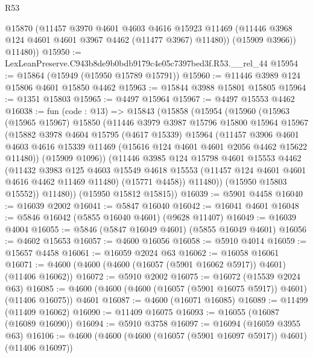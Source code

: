 \begin{lexlean}{R53}
\begin{coremodule}
          @15870
          (@11457
            @3970
            @4601
            @4603
            @4616
            @15923
            @11469
            (@11446 @3968 @124 @4601 @4601 @3967 @4462 (@11477 @3967) @11480))
          (@15909 @3966))
        @11480))
@15950 := LexLeanPreserve.C943b8de9b0bdb9179c4e05c7397bed3f.R53.__rel_44
@15954 := @15864 (@15949 (@15950 @15789 @15791))
@15960 := @11446 @3989 @124 @15806 @4601 @15850 @4462
@15963 := @15844 @3988 @15801 @15805
@15964 := @1351 @15803
@15965 := @4497 @15964
@15967 := @4497 @15553 @4462
@16038 := fun (code : @13) =>
  @15843
    (@15858
      (@15954
        (@15960
          (@15963
            (@15965 @15967)
            @15850
            (@11446
              @3979
              @3987
              @15796
              @15800
              @15964
              @15967
              (@15882
                @3978
                @4604
                @15795
                (@4617 @15339)
                @15964
                (@11457
                  @3906
                  @4601
                  @4603
                  @4616
                  @15339
                  @11469
                  (@15616 @124 @4601 @4601 @2056 @4462 @15622 @11480))
                (@15909 @1096))
              (@11446
                @3985
                @124
                @15798
                @4601
                @15553
                @4462
                (@11432
                  @3983
                  @125
                  @4603
                  @15549
                  @4618
                  @15553
                  (@11457 @124 @4601 @4601 @4616 @4462 @11469 @11480)
                  (@15771 @4458))
                @11480))
            (@15950 @15803 @15552))
          @11480))
      (@15950 @15812 @15815))
@16039 := @5901 @4458
@16040 := @16039 @2002
@16041 := @5847 @16040
@16042 := @16041 @4601
@16048 := @5846 @16042 (@5855 @16040 @4601) (@9628 @11407)
@16049 := @16039 @4004
@16055 := @5846 (@5847 @16049 @4601) (@5855 @16049 @4601)
@16056 := @4602 @15653
@16057 := @4600 @16056
@16058 := @5910 @4014
@16059 := @15657 @4458
@16061 := @16059 @2024 @63
@16062 := @16058 @16061
@16071 := @4600 (@4600 (@4600 (@16057 (@5901 @16062 @5917)) @4601) (@11406 @16062))
@16072 := @5910 @2002
@16075 := @16072 (@15539 @2024 @63)
@16085 := @4600 (@4600 (@4600 (@16057 (@5901 @16075 @5917)) @4601) (@11406 @16075)) @4601
@16087 := @4600 (@16071 @16085)
@16089 := @11499 (@11409 @16062)
@16090 := @11409 @16075
@16093 := @16055 (@16087 (@16089 @16090))
@16094 := @5910 @3758
@16097 := @16094 (@16059 @3955 @63)
@16106 := @4600 (@4600 (@4600 (@16057 (@5901 @16097 @5917)) @4601) (@11406 @16097))

\end{coremodule}
\end{lexlean}
